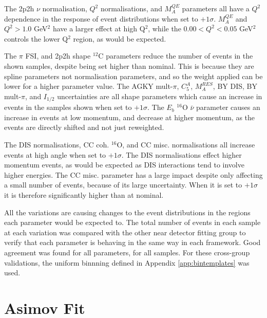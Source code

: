 The 2p2h $\nu$ normalisation, $Q^2$ normalisations, and $M^{QE}_A$ parameters all have a $Q^2$ dependence in the response of event distributions when set to $+1\sigma$. $M^{QE}_A$ and $Q^{2}>1.0$ GeV$^2$ have a larger effect at high Q$^2$, while the $0.00<Q^{2}<0.05$ GeV$^2$ controls the lower Q$^2$ region, as would be expected.

The $\pi$ FSI, and 2p2h shape $^{12}$C parameters reduce the number of events in the shown samples, despite being set higher than nominal. This is because they are spline parameters not normalisation parameters, and so the weight applied can be lower for a higher parameter value. The AGKY mult-$\pi$, $C^{A}_{5}$, $M^{RES}_{A}$, BY DIS, BY mult-$\pi$, and $I_{1/2}$ uncertainties are all shape parameters which cause an increase in events in the samples shown when set to $+1\sigma$. The $E_{b}$ $^{16}$O $\bar{\nu}$ parameter causes an increase in events at low momentum, and decrease at higher momentum, as the events are directly shifted and not just reweighted.

The DIS normalisations, CC coh. $^{16}$O, and CC misc. normalisations all increase events at high angle when set to $+1\sigma$. The DIS normalisations effect higher momentum events, as would be expected as DIS interactions tend to involve higher energies. The CC misc. parameter has a large impact despite only affecting a small number of events, because of its large uncertainty. When it is set to $+1\sigma$ it is therefore significantly higher than at nominal.

All the variations are causing changes to the event distributions in the regions each parameter would be expected to. The total number of events in each sample at each variation was compared with the other near detector fitting group to verify that each parameter is behaving in the same way in each framework. Good agreement was found for all parameters, for all samples. For these cross-group validations, the uniform binnning defined in Appendix \ref{app:bintemplates} was used.

\section{Asimov Fit}\label{sec:asimov}

